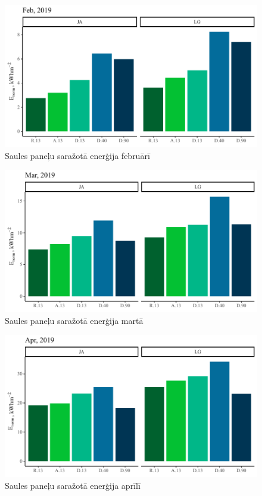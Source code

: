 \begin{figure}[h]
    \centering
    \includegraphics[width=\linewidth]{figures/sol_month/feb_m_m2.pdf}
    \caption{Saules paneļu saražotā enerģija februārī}
    \label{fig:feb_sum}
\end{figure}

\begin{figure}[h]
    \centering
    \includegraphics[width=\linewidth]{figures/sol_month/mar_m_m2.pdf}
    \caption{Saules paneļu saražotā enerģija martā}
    \label{fig:mar_sum}
\end{figure}

\begin{figure}[h]
    \centering
    \includegraphics[width=\linewidth]{figures/sol_month/apr_m_m2.pdf}
    \caption{Saules paneļu saražotā enerģija aprīlī}
    \label{fig:apr_sum}
\end{figure}


